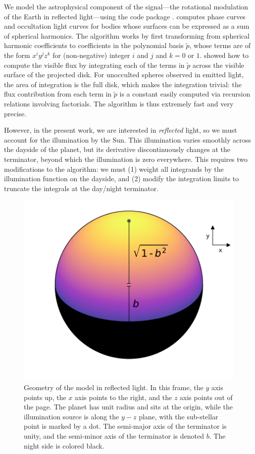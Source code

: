 \documentclass[modern]{aastex62}
\begin{document}
We model the astrophysical component of the signal---the rotational modulation
of the Earth in reflected light---using the \starry code package \citep{Luger2019}.
\starry computes phase curves and occultation light curves for bodies whose
surfaces can be expressed as a sum of spherical harmonics. 
The algorithm works by first transforming
from spherical harmonic coefficients to coefficients in the polynomial basis $\tilde{p}$, whose
terms are of the form $x^i y^j z^k$ for (non-negative) integer $i$ and $j$ 
and $k = 0$ or $1$. \citet{Luger2019} showed how to compute the visible
flux by integrating each of the terms in $\tilde{p}$ across the visible
surface of the projected disk. For unocculted spheres observed in emitted
light, the area of integration is the full disk, which makes the integration
trivial: the flux contribution from each term in $\tilde{p}$ is a constant
easily computed via recursion relations involving factorials. The algorithm is
thus extremely fast and very precise.

However, in the present work, we are interested in \emph{reflected} light, so we must
account for the illumination by the Sun. This illumination varies smoothly
across the dayside of the planet, but its derivative discontinuously changes at the 
terminator, beyond which the illumination is zero everywhere. This requires
two modifications to the \starry algorithm: we must (1) weight all integrands
by the illumination function on the dayside, and (2) modify the integration
limits to truncate the integrals at the day/night terminator.

\begin{figure}[t!]
    \begin{centering}
    \includegraphics[width=0.4\linewidth]{figures/geometry.pdf}
    \caption{\label{fig:geometry}
             Geometry of the \starry model in reflected light. In this frame, 
             the $y$ axis points up, 
             the $x$ axis points to the right, and the $z$ axis points out of the page.
             The planet has unit radius and sits at the origin, while
             the illumination source is along the $y-z$ plane, with the sub-stellar point is
             marked by a dot. The semi-major axis of the terminator is unity, and
             the semi-minor axis of the terminator is denoted $b$. The night side
             is colored black.
             }
    \end{centering}
\end{figure}
\end{document}
